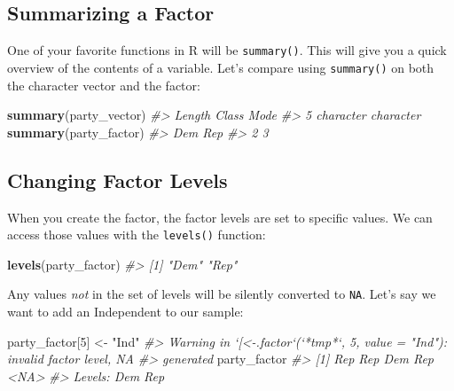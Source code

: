 \documentclass[
]{book}
\newenvironment{Shaded}{\begin{snugshade}}{\end{snugshade}}
\newcommand{\CommentTok}[1]{\textcolor[rgb]{0.56,0.35,0.01}{\textit{#1}}}
\newcommand{\DecValTok}[1]{\textcolor[rgb]{0.00,0.00,0.81}{#1}}
\newcommand{\KeywordTok}[1]{\textcolor[rgb]{0.13,0.29,0.53}{\textbf{#1}}}
\newcommand{\NormalTok}[1]{#1}
\newcommand{\StringTok}[1]{\textcolor[rgb]{0.31,0.60,0.02}{#1}}
\begin{document}
\hypertarget{summarizing-a-factor}{%
\subsection{Summarizing a Factor}\label{summarizing-a-factor}}

One of your favorite functions in R will be \texttt{summary()}. This will give you a quick overview of the contents of a variable. Let's compare using \texttt{summary()} on both the character vector and the factor:

\begin{Shaded}
\begin{Highlighting}[]
\KeywordTok{summary}\NormalTok{(party_vector)}
\CommentTok{#>    Length     Class      Mode }
\CommentTok{#>         5 character character}
\KeywordTok{summary}\NormalTok{(party_factor)}
\CommentTok{#> Dem Rep }
\CommentTok{#>   2   3}
\end{Highlighting}
\end{Shaded}

\hypertarget{changing-factor-levels}{%
\subsection{Changing Factor Levels}\label{changing-factor-levels}}

When you create the factor, the factor levels are set to specific values. We can access those values with the \texttt{levels()} function:

\begin{Shaded}
\begin{Highlighting}[]
\KeywordTok{levels}\NormalTok{(party_factor)}
\CommentTok{#> [1] "Dem" "Rep"}
\end{Highlighting}
\end{Shaded}

Any values \emph{not} in the set of levels will be silently converted to \texttt{NA}. Let's say we want to add an Independent to our sample:

\begin{Shaded}
\begin{Highlighting}[]
\NormalTok{party_factor[}\DecValTok{5}\NormalTok{] <-}\StringTok{ "Ind"}
\CommentTok{#> Warning in `[<-.factor`(`*tmp*`, 5, value = "Ind"): invalid factor level, NA}
\CommentTok{#> generated}
\NormalTok{party_factor}
\CommentTok{#> [1] Rep  Rep  Dem  Rep  <NA>}
\CommentTok{#> Levels: Dem Rep}
\end{Highlighting}
\end{Shaded}
\end{document}
